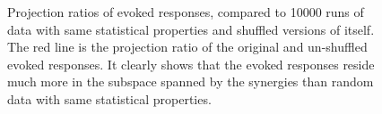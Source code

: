 \begin{figure}[ht]
\centering
{}
\caption{Projection ratios of evoked responses, compared to 10000 runs of data with same statistical properties and shuffled versions of itself. The red line is the projection ratio of the original and un-shuffled evoked responses. It clearly shows that the evoked responses reside much more in the subspace spanned by the synergies than random data with same statistical properties.}
\end{figure}








